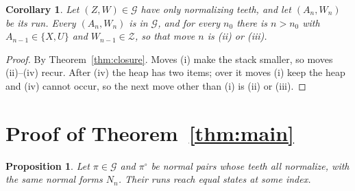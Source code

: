 \documentclass[11pt]{amsart}
\newtheorem{corollary}[theorem]{Corollary}
\newtheorem{proposition}[theorem]{Proposition}
\theoremstyle{definition}
\newcommand{\Gc}{\mathcal G}
\newcommand{\Zc}{\mathcal Z}
\begin{document}
\begin{corollary}\label{cor:recur}
Let $(Z,W)\in\Gc$ have only normalizing teeth, and let $(A_n,W_n)$ be its run. Every
$(A_n,W_n)$ is in $\Gc$, and for every $n_0$ there is $n>n_0$ with $A_{n-1}\in\{X,U\}$ and $W_{n-1}\in\Zc$, so that move $n$
is \textup{(ii)} or \textup{(iii)}.
\end{corollary}

\begin{proof}
By Theorem~\ref{thm:closure}. Moves (i) make the stack smaller, so moves (ii)--(iv) recur. After
(iv) the heap has two items; over it moves (i) keep the heap and (iv) cannot occur, so the next move
other than (i) is (ii) or (iii).
\end{proof}

\section{Proof of Theorem~\ref{thm:main}}\label{sec:proof}

\begin{proposition}\label{prop:meet}
Let $\pi\in\Gc$ and $\pi^\circ$ be normal pairs whose teeth all normalize, with the same normal
forms $N_n$. Their runs reach equal states at some index.
\end{proposition}
\end{document}
